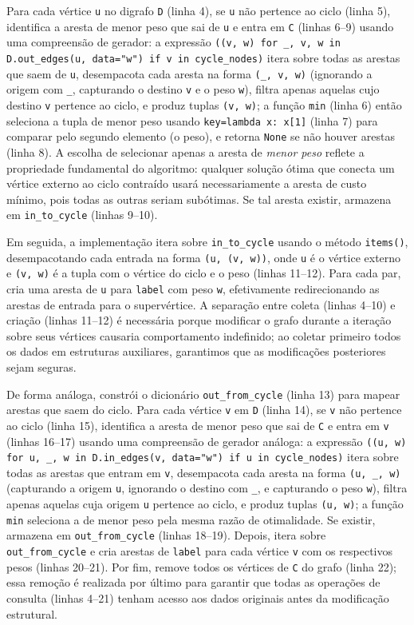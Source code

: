 Para cada vértice \texttt{u} no digrafo \texttt{D} (linha 4), se \texttt{u} não pertence ao ciclo (linha 5), identifica a aresta de menor peso que sai de \texttt{u} e entra em \texttt{C} (linhas 6--9) usando uma compreensão de gerador: a expressão \texttt{((v, w) for \_, v, w in D.out\_edges(u, data="w") if v in cycle\_nodes)} itera sobre todas as arestas que saem de \texttt{u}, desempacota cada aresta na forma \texttt{(\_, v, w)} (ignorando a origem com \texttt{\_}, capturando o destino \texttt{v} e o peso \texttt{w}), filtra apenas aquelas cujo destino \texttt{v} pertence ao ciclo, e produz tuplas \texttt{(v, w)}; a função \texttt{min} (linha 6) então seleciona a tupla de menor peso usando \texttt{key=lambda x: x[1]} (linha 7) para comparar pelo segundo elemento (o peso), e retorna \texttt{None} se não houver arestas (linha 8). A escolha de selecionar apenas a aresta de \emph{menor peso} reflete a propriedade fundamental do algoritmo: qualquer solução ótima que conecta um vértice externo ao ciclo contraído usará necessariamente a aresta de custo mínimo, pois todas as outras seriam subótimas. Se tal aresta existir, armazena em \texttt{in\_to\_cycle} (linhas 9--10).

Em seguida, a implementação itera sobre \texttt{in\_to\_cycle} usando o método \texttt{items()}, desempacotando cada entrada na forma \texttt{(u, (v, w))}, onde \texttt{u} é o vértice externo e \texttt{(v, w)} é a tupla com o vértice do ciclo e o peso (linhas 11--12). Para cada par, cria uma aresta de \texttt{u} para \texttt{label} com peso \texttt{w}, efetivamente redirecionando as arestas de entrada para o supervértice. A separação entre coleta (linhas 4--10) e criação (linhas 11--12) é necessária porque modificar o grafo durante a iteração sobre seus vértices causaria comportamento indefinido; ao coletar primeiro todos os dados em estruturas auxiliares, garantimos que as modificações posteriores sejam seguras.

De forma análoga, constrói o dicionário \texttt{out\_from\_cycle} (linha 13) para mapear arestas que saem do ciclo. Para cada vértice \texttt{v} em \texttt{D} (linha 14), se \texttt{v} não pertence ao ciclo (linha 15), identifica a aresta de menor peso que sai de \texttt{C} e entra em \texttt{v} (linhas 16--17) usando uma compreensão de gerador análoga: a expressão \texttt{((u, w) for u, \_, w in D.in\_edges(v, data="w") if u in cycle\_nodes)} itera sobre todas as arestas que entram em \texttt{v}, desempacota cada aresta na forma \texttt{(u, \_, w)} (capturando a origem \texttt{u}, ignorando o destino com \texttt{\_}, e capturando o peso \texttt{w}), filtra apenas aquelas cuja origem \texttt{u} pertence ao ciclo, e produz tuplas \texttt{(u, w)}; a função \texttt{min} seleciona a de menor peso pela mesma razão de otimalidade. Se existir, armazena em \texttt{out\_from\_cycle} (linhas 18--19). Depois, itera sobre \texttt{out\_from\_cycle} e cria arestas de \texttt{label} para cada vértice \texttt{v} com os respectivos pesos (linhas 20--21). Por fim, remove todos os vértices de \texttt{C} do grafo (linha 22); essa remoção é realizada por último para garantir que todas as operações de consulta (linhas 4--21) tenham acesso aos dados originais antes da modificação estrutural.

